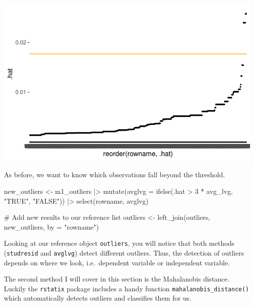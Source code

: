 \documentclass[
  letterpaper,
]{krantz}
\makeatletter
\newenvironment{Shaded}{\begin{snugshade}}{\end{snugshade}}
\newcommand{\AttributeTok}[1]{\textcolor[rgb]{0.40,0.45,0.13}{#1}}
\newcommand{\CommentTok}[1]{\textcolor[rgb]{0.37,0.37,0.37}{#1}}
\newcommand{\DecValTok}[1]{\textcolor[rgb]{0.68,0.00,0.00}{#1}}
\newcommand{\FunctionTok}[1]{\textcolor[rgb]{0.28,0.35,0.67}{#1}}
\newcommand{\NormalTok}[1]{\textcolor[rgb]{0.00,0.23,0.31}{#1}}
\newcommand{\OtherTok}[1]{\textcolor[rgb]{0.00,0.23,0.31}{#1}}
\newcommand{\SpecialCharTok}[1]{\textcolor[rgb]{0.37,0.37,0.37}{#1}}
\newcommand{\StringTok}[1]{\textcolor[rgb]{0.13,0.47,0.30}{#1}}
\newenvironment{kframe}{%
\medskip{}
\setlength{\fboxsep}{.8em}
 \def\at@end@of@kframe{}%
 \ifinner\ifhmode%
  \def\at@end@of@kframe{\end{minipage}}%
  \begin{minipage}{\columnwidth}%
 \fi\fi%
 \def\FrameCommand##1{\hskip\@totalleftmargin \hskip-\fboxsep
 \colorbox{shadecolor}{##1}\hskip-\fboxsep
     \hskip-\linewidth \hskip-\@totalleftmargin \hskip\columnwidth}%
 \MakeFramed {\advance\hsize-\width
   \@totalleftmargin\z@ \linewidth\hsize
   \@setminipage}}%
 {\par\unskip\endMakeFramed%
 \at@end@of@kframe}
\renewenvironment{Shaded}{\begin{kframe}}{\end{kframe}}
\makeatother
\begin{document}
\includegraphics{13_regressions_files/figure-latex/avg-lvg-plot-1.pdf}

As before, we want to know which observations fall beyond the threshold.

\begin{Shaded}
\begin{Highlighting}[]
\NormalTok{new\_outliers }\OtherTok{\textless{}{-}}
\NormalTok{  m1\_outliers }\SpecialCharTok{|\textgreater{}}
  \FunctionTok{mutate}\NormalTok{(}\AttributeTok{avglvg =} \FunctionTok{ifelse}\NormalTok{(.hat }\SpecialCharTok{\textgreater{}} \DecValTok{3} \SpecialCharTok{*}\NormalTok{ avg\_lvg, }\StringTok{"TRUE"}\NormalTok{, }\StringTok{"FALSE"}\NormalTok{)) }\SpecialCharTok{|\textgreater{}}
  \FunctionTok{select}\NormalTok{(rowname, avglvg)}

\CommentTok{\# Add new results to our reference list}
\NormalTok{outliers }\OtherTok{\textless{}{-}} \FunctionTok{left\_join}\NormalTok{(outliers, new\_outliers, }\AttributeTok{by =} \StringTok{"rowname"}\NormalTok{)}
\end{Highlighting}
\end{Shaded}

Looking at our reference object \texttt{outliers}, you will notice that
both methods (\texttt{studresid} and \texttt{avglvg}) detect different
outliers. Thus, the detection of outliers depends on where we look,
i.e.~dependent variable or independent variable.

The second method I will cover in this section is the Mahalanobis
distance. Luckily the \texttt{rstatix} package includes a handy function
\texttt{mahalanobis\_distance()} which automatically detects outliers
and classifies them for us.
\end{document}
